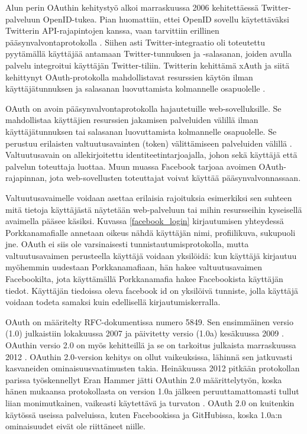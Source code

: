 Alun perin OAuthin kehitystyö alkoi marraskuussa 2006 kehitettäessä Twitter-pal\-ve\-luun OpenID-tukea. Pian huomattiin, ettei OpenID sovellu käytettäväksi Twitterin API-rajapintojen kanssa, vaan tarvittiin erillinen pääsynvalvontaprotokolla \cite{}. Siihen asti Twitter-integraatio oli toteutettu pyytämällä käyttäjää antamaan Twitter-tunnuksen ja -salasanan, joiden avulla palvelu integroitui käyttäjän Twitter-tiliin. Twitterin kehittämä xAuth ja siitä kehittynyt OAuth-protokolla mahdollistavat resurssien käytön ilman käyttäjätunnuksen ja salasanan luovuttamista kolmannelle osapuolelle \cite{oauth2_0}.

OAuth on avoin pääsynvalvontaprotokolla hajautetuille web-sovelluksille. Se mahdollistaa käyttäjien resurssien jakamisen palveluiden välillä ilman käyttäjätunnuksen tai salasanan luovuttamista kolmannelle osapuolelle. Se perustuu erilaisten valtuutusavainten (token) välittämiseen palveluiden välillä \cite{oauth2_0}. Valtuutusavain on allekirjoitettu identiteetintarjoajalla, johon sekä käyttäjä että palvelun toteuttaja luottaa. Muun muassa Facebook tarjoaa avoimen OAuth-rajapinnan, jota web-sovellusten toteuttajat voivat käyttää pääsynvalvonnassaan.

Valtuutusavaimelle voidaan asettaa erilaisia rajoituksia esimerkiksi sen suhteen mitä tietoja käyttäjästä näytetään web-palveluun tai mihin resursseihin kyseisellä avaimella pääsee käsiksi. Kuvassa \ref{facebook_login} kirjautumisen yhteydessä Porkkanamafialle annetaan oikeus nähdä käyttäjän nimi, profiilikuva, sukupuoli jne. OAuth ei siis ole varsinaisesti tunnistautumisprotokolla, mutta valtuutusavaimen perusteella käyttäjä voidaan yksilöidä: kun käyttäjä kirjautuu myöhemmin uudestaan Porkkanamafiaan, hän hakee valtuutusavaimen Facebookilta, jota käyttämällä Porkkanamafia hakee Facebookista käyttäjän tiedot. Käyttäjän tiedoissa oleva facebook id on yksilöivä tunniste, jolla käyttäjä voidaan todeta samaksi kuin edellisellä kirjautumiskerralla.

OAuth on määritelty RFC-dokumentissa numero 5849. Sen ensimmäinen versio (1.0) julkaistiin lokakuussa 2007 ja päivitetty versio (1.0a) kesäkuussa 2009 \cite{oauth2_0}. OAuthin versio 2.0 on myös kehitteillä ja se on tarkoitus julkaista marraskuussa 2012 \cite{oauth2_0}. OAuthin 2.0-version kehitys on ollut vaikeuksissa, lähinnä sen jatkuvasti kasvaneiden ominaisuusvaatimusten takia. Heinäkuussa 2012 pitkään protokollan parissa työskennellyt Eran Hammer jätti OAuthin 2.0 määrittelytyön, koska hänen mukaansa protokollasta on version 1.0a jälkeen peruuttamattomasti tullut liian monimutkainen, vaikeasti käytettävä ja turvaton \cite{oauth_ragequit}. OAuth 2.0 on kuitenkin käytössä useissa palveluissa, kuten Facebookissa ja GitHubissa, koska 1.0a:n ominaisuudet eivät ole riittäneet niille.